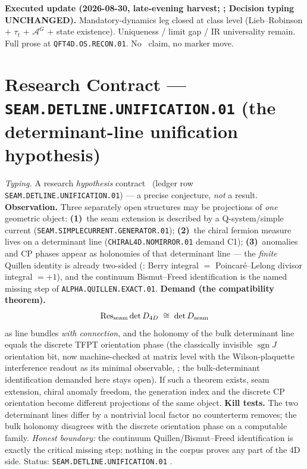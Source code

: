 \par\smallskip\noindent\textbf{Executed update (2026-08-30, late-evening harvest;
;
Decision typing UNCHANGED).}
Mandatory-dynamics leg closed at class level (Lieb--Robinson $+$ $\tau_t$ $+$ $\mathcal A^G$
$+$ state existence).  Uniqueness / limit gap / IR universality remain.  Full prose at
\texttt{QFT4D.OS.RECON.01}.  No \mE\ claim, no marker move.

\section*{Research Contract --- \texttt{SEAM.DETLINE.UNIFICATION.01} (the determinant-line unification hypothesis)}
\noindent\emph{Typing.} A research \emph{hypothesis} contract \mO\ (ledger row
\texttt{SEAM.DETLINE.UNIFICATION.01}) --- a precise conjecture, \emph{not} a result.
\textbf{Observation.}  Three separately open structures may be projections of \emph{one}
geometric object: \textbf{(1)}~the seam extension is described by a Q-system/simple current
(\texttt{SEAM.SIMPLECURRENT.GENERATOR.01}); \textbf{(2)}~the chiral fermion measure lives on a
determinant line (\texttt{CHIRAL4D.NOMIRROR.01} demand C1); \textbf{(3)}~anomalies and CP
phases appear as holonomies of that determinant line --- the \emph{finite} Quillen identity is
already two-sided (: Berry integral $=$
Poincar\'e--Lelong divisor integral $=+1$), and the continuum Bismut--Freed identification is
the named missing step of \texttt{ALPHA.QUILLEN.EXACT.01}.  \textbf{Demand (the compatibility
theorem).}
\[
\operatorname{Res}_{\rm seam}\det D_{4D}\;\cong\;\det D_{\rm seam}
\]
as line bundles \emph{with connection}, and the holonomy of the bulk determinant line equals
the discrete TFPT orientation phase (the classically invisible $\operatorname{sgn}J$
orientation bit, now machine-checked at matrix level with the Wilson-plaquette interference
readout as its minimal observable, ; the
bulk-determinant identification demanded here stays open).  If such a theorem exists, seam extension, chiral
anomaly freedom, the generation index and the discrete CP orientation become different
projections of the same object.  \textbf{Kill tests.}  The two determinant lines differ by a
nontrivial local factor no counterterm removes; the bulk holonomy disagrees with the discrete
orientation phase on a computable family.  \emph{Honest boundary:} the continuum
Quillen/Bismut--Freed identification is exactly the critical missing step; nothing in the
corpus proves any part of the 4D side.  Status: \texttt{SEAM.DETLINE.UNIFICATION.01} \mO.

